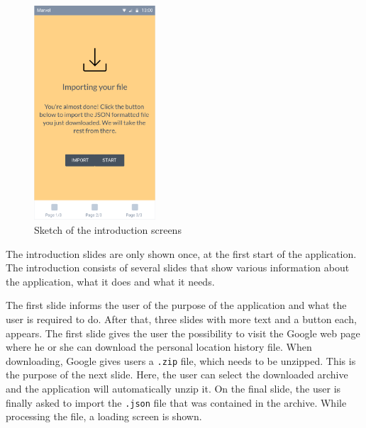 \documentclass[12p]{article}
\begin{document}
\begin{figure}[ht]
        		\includegraphics[height=8cm,keepaspectratio]{pics/app_design/intro3.PNG}
    		    \caption{Sketch of the introduction screens}
            \end{figure}
            
            The introduction slides are only shown once, at the first start of the application. The introduction consists of several slides that show various information about the application, what it does and what it needs.
            
            The first slide informs the user of the purpose of the application and what the user is required to do. After that, three slides with more text and a button each, appears. The first slide gives the user the possibility to visit the Google web page where he or she can download the personal location history file. When downloading, Google gives users a \texttt{.zip} file, which needs to be unzipped. This is the purpose of the next slide. Here, the user can select the downloaded archive and the application will automatically unzip it. On the final slide, the user is finally asked to import the \texttt{.json} file that was contained in the archive. While processing the file, a loading screen is shown.
    		
\end{document}
